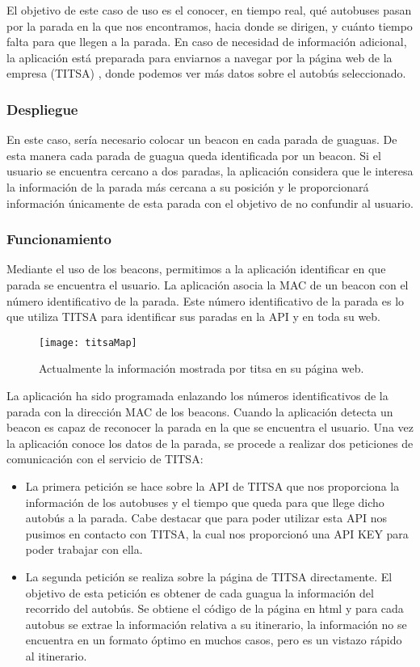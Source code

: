 El objetivo de este caso de uso es el conocer, en tiempo real, qué autobuses pasan por la parada en la que nos encontramos, hacia donde se dirigen, y cuánto tiempo falta para que llegen a la parada. En caso de necesidad de información adicional, la aplicación está preparada para enviarnos a navegar por la página web de la empresa (TITSA) , donde podemos ver más datos sobre el autobús seleccionado.


\subsubsection{Despliegue}

En este caso, sería necesario colocar un beacon en cada parada de guaguas. De esta manera cada parada de guagua queda identificada por un beacon. Si el usuario se encuentra cercano a dos paradas, la aplicación considera que le interesa la información de la parada más cercana a su posición y le proporcionará información únicamente de esta parada con el objetivo de no confundir al usuario.


\subsubsection{Funcionamiento}


Mediante el uso de los beacons, permitimos a la aplicación identificar en que parada se encuentra el usuario. La aplicación asocia la MAC de un beacon con el número identificativo de la parada. Este número identificativo de la parada es lo que utiliza TITSA para identificar sus paradas en la API y en toda su web.

\begin{figure}[H]
	\centering
	\texttt{[image: titsaMap]}
	\caption{Actualmente la información mostrada por titsa en su página web.}
	\label{fig:MapaTitsa}
\end{figure}

La aplicación ha sido programada enlazando los números identificativos de la parada con la dirección MAC de los beacons. Cuando la aplicación detecta un beacon es capaz de reconocer la parada en la que se encuentra el usuario. Una vez la aplicación conoce los datos de la parada, se procede a realizar dos peticiones de comunicación con el servicio de TITSA: 

\begin{itemize}
\item La primera petición se hace sobre la API de TITSA que nos proporciona la información de los autobuses y el tiempo que queda para que llege dicho autobús a la parada. Cabe destacar que para poder utilizar esta API nos pusimos en contacto con TITSA, la cual nos proporcionó una API KEY para poder trabajar con ella.
\item La segunda petición se realiza sobre la página de TITSA directamente. El objetivo de esta petición es obtener de cada guagua la información del recorrido del autobús. Se obtiene el código de la página en html y para cada autobus se extrae la información relativa a su itinerario, la información no se encuentra en un formato óptimo en muchos casos, pero es un vistazo rápido al itinerario.
\end{itemize}


